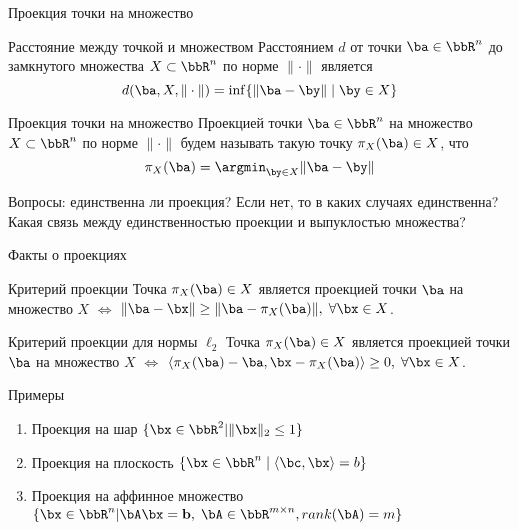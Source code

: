 \documentclass[12pt]{beamer}
\begin{document}
\begin{frame}{Проекция точки на множество}
\small
\begin{block}{Расстояние между точкой и множеством}
Расстоянием $d$ от точки $\ba \in \bbR^n$ до замкнутого множества $X \subset \bbR^n$ по норме $\| \cdot \|$ является
\vspace{-4mm}
\[
d(\ba, X, \| \cdot \|) = \inf\{\| \ba - \by \| \; | \; \by \in X\}
\]
\end{block}
\begin{block}{Проекция точки на множество}
Проекцией точки $\ba \in \bbR^n$ на множество $X \subset \bbR^n$ по норме $\| \cdot \|$ будем называть такую точку $\pi_X(\ba) \in X$, что
\vspace{-4mm}
\[
\pi_X(\ba) = \argmin_{\by \in X} \| \ba - \by \|
\]
\end{block}
Вопросы: единственна ли проекция? Если нет, то в каких случаях единственна? Какая связь между единственностью проекции и выпуклостью множества?

\end{frame}

\begin{frame}{Факты о проекциях}

\begin{block}{Критерий проекции}
Точка $\pi_X(\ba) \in X$ является проекцией точки $\ba$ на множество $X$ $\Leftrightarrow$ $\| \ba - \bx \| \geq \| \ba - \pi_X(\ba) \|, \; \forall \bx \in X$.
\end{block}

\begin{block}{Критерий проекции для нормы $\ell_2$}
Точка $\pi_X(\ba) \in X$ является проекцией точки $\ba$ на множество $X$ $\Leftrightarrow$ $\langle \pi_X(\ba) - \ba, \bx - \pi_X(\ba) \rangle \geq 0, \; \forall \bx \in X$.
\end{block}
\end{frame}

\begin{frame}{Примеры}
\begin{enumerate}
\item Проекция на шар $\{\bx \in \bbR^2 | \| \bx \|_2 \leq 1\}$
\item Проекция на плоскость $\{ \bx \in \bbR^n \; | \; \langle \bc, \bx \rangle = b \}$
\item Проекция на аффинное множество $\{ \bx \in \bbR^n | \bA\bx = \mathbf{b}, \; \bA \in \bbR^{m \times n}, rank(\bA) = m \}$
\end{enumerate}
\end{frame}
\end{document}
